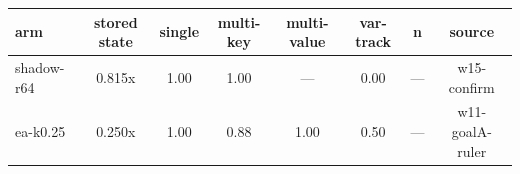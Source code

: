 \begin{tabular}{lccccccc}
\toprule
arm & stored state & single & multi-key & multi-value & var-track & n & source \\
\midrule
shadow-r64 & 0.815x & 1.00 & 1.00 & --- & 0.00 & --- & w15-confirm \\
ea-k0.25 & 0.250x & 1.00 & 0.88 & 1.00 & 0.50 & --- & w11-goalA-ruler \\
\bottomrule
\end{tabular}
